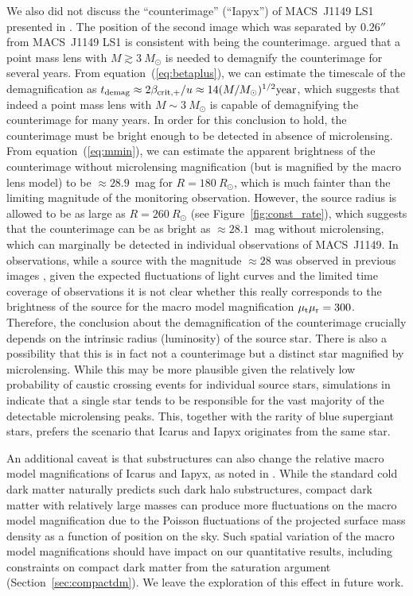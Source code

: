 \documentclass[showpacs,twocolumn,preprintnumbers,amsmath,amssymb,superscriptaddress,nofootinbib]{revtex4}
\begin{document}
We also did not discuss the ``counterimage'' (``Iapyx'') of MACS~J1149
LS1 presented in \cite{Kelly:2017fps}. The position of the second image
which was separated by $0.26''$ from MACS~J1149 LS1 is consistent with
being the counterimage. \cite{Kelly:2017fps} argued that a point mass
lens with $M\gtrsim 3~M_\odot$ is needed to demagnify the counterimage
for several years.  From equation~(\ref{eq:betaplus}), we can estimate
the timescale of the demagnification as $t_{\rm demag}\approx
2\beta_{{\rm crit},+}/u\approx 14(M/M_\odot)^{1/2}{\rm year}$, which
suggests that indeed a point mass lens with $M\sim 3~M_\odot$ is
capable of demagnifying the counterimage for many years. In
order for this conclusion to hold, the counterimage must be bright
enough to be detected in absence of microlensing. From
equation~(\ref{eq:mmin}), we can estimate the apparent brightness of
the counterimage without microlensing magnification (but is magnified
by the macro lens model) to be $\approx 28.9$~mag for $R=180~R_\odot$,
which is much fainter than the limiting magnitude of the monitoring
observation. However, the source radius is allowed to be as large as
$R=260~R_\odot$ (see Figure~\ref{fig:const_rate}), which suggests that
the counterimage can be as bright as $\approx 28.1$~mag without
microlensing, which can marginally be detected in individual
observations of  MACS~J1149. In observations, while a source with the
magnitude $\approx 28$ was observed in previous images
\cite{Kelly:2017fps}, given the expected fluctuations of light curves
and the limited time coverage of observations it is not clear whether
this really corresponds to the brightness of the source for the macro
model magnification $\mu_{\rm t}\mu_{\rm r}=300$. Therefore, the conclusion
about the demagnification of the counterimage crucially depends on the
intrinsic radius (luminosity) of the source star. There is also a
possibility that this is in fact not a counterimage but a distinct
star magnified by microlensing. While this may be more plausible given
the relatively low probability of caustic crossing events for
individual source stars, simulations in \cite{Kelly:2017fps} indicate
that a single star tends to be responsible for the vast majority of
the detectable microlensing peaks. This, together with the rarity of
blue supergiant stars, prefers the scenario that Icarus and Iapyx
originates from the same star. 

An additional caveat is that substructures can also change the relative
macro model magnifications of Icarus and Iapyx, as noted in
\cite{Kelly:2017fps}. While the standard cold dark matter naturally
predicts such dark halo substructures, compact dark matter with
relatively large masses can produce more fluctuations on the macro
model magnification due to the Poisson fluctuations of the projected
surface mass density as a function of position on the sky. Such
spatial variation of the macro model magnifications should have impact
on our quantitative results, including constraints on compact dark
matter from the saturation argument (Section~\ref{sec:compactdm}). We
leave the exploration of this effect in future work.
\end{document}
